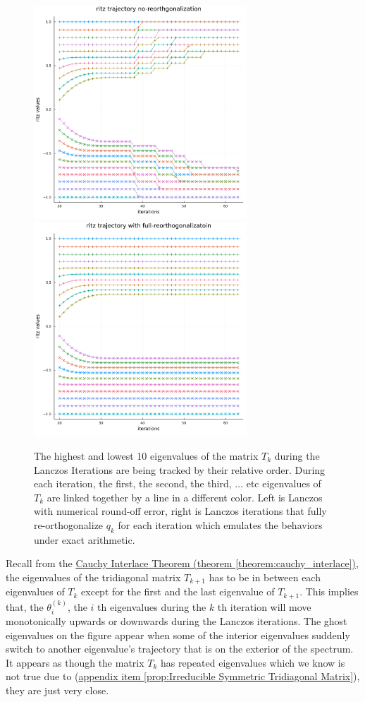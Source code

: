 \documentclass[]{article}
\theoremstyle{definition}
\begin{document}
            \begin{figure}[H]
                \centering
                \includegraphics[width=8cm]{ritz_trajectory_plot_floats.png}
                \includegraphics[width=8cm]{ritz_trajectory_plot_exact.png}
                \caption{The highest and lowest 10 eigenvalues of the matrix $T_k$ during the Lanczos Iterations are being tracked by their relative order. During each iteration, the first, the second, the third, ... etc eigenvalues of $T_k$ are linked together by a line in a different color. Left is Lanczos with numerical round-off error, right is Lanczos iterations that fully re-orthogonalize $q_k$ for each iteration which emulates the behaviors under exact arithmetic. }
            \end{figure}\label{fig:2}
            Recall from the \hyperref[theorem:cauchy_interlace]{Cauchy Interlace Theorem (theorem \ref*{theorem:cauchy_interlace})}, the eigenvalues of the tridiagonal matrix $T_{k + 1}$ has to be in between each eigenvalues of $T_{k}$ except for the first and the last eigenvalue of $T_{k + 1}$.  This implies that, the $\theta_i^{(k)}$, the $i$ th eigenvalues during the $k$ th iteration will move monotonically upwards or downwards during the Lanczos iterations. The ghost eigenvalues on the figure appear when some of the interior eigenvalues suddenly switch to another eigenvalue's trajectory that is on the exterior of the spectrum. It appears as though the matrix $T_k$ has repeated eigenvalues which we know is not true due to (\hyperref[prop:Irreducible Symmetric Tridiagonal Matrix]{appendix item \ref*{prop:Irreducible Symmetric Tridiagonal Matrix}}), they are just very close. 
\end{document}
